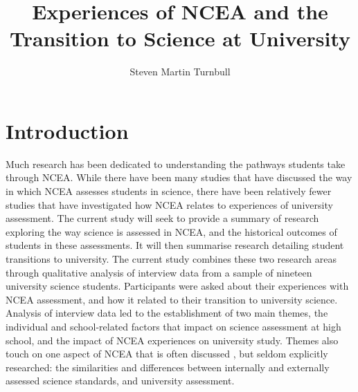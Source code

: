 \documentclass[a4paper,man,natbib]{apa6}
\title{Experiences of NCEA and the Transition to Science at University}
\author{Steven Martin Turnbull}
\affiliation{School of Critical Studies in Education, Faculty of Education and Social Work, The University of Auckland}
\begin{document}
\maketitle


\begin{abstract}
    

\end{abstract}

\section{Introduction}
Much research has been dedicated to understanding the pathways students take through NCEA. While there have been many studies that have discussed the way in which NCEA assesses students in science, there have been relatively fewer studies that have investigated how NCEA relates to experiences of university assessment. The current study will seek to provide a summary of research exploring the way science is assessed in NCEA, and the historical outcomes of students in these assessments. It will then summarise research detailing student transitions to university. The current study combines these two research areas through qualitative analysis of interview data from a sample of nineteen university science students. Participants were asked about their experiences with NCEA assessment, and how it related to their transition to university science. Analysis of interview data led to the establishment of two main themes, the individual and school-related factors that impact on science assessment at high school, and the impact of NCEA experiences on university study. Themes also touch on one aspect of NCEA that is often discussed \cite{lipson2018spoiled}, but seldom explicitly researched: the similarities and differences between internally and externally assessed science standards, and university assessment. 
\end{document}
